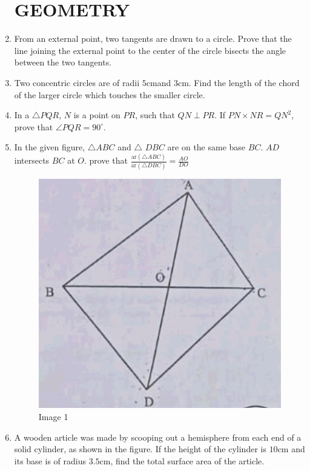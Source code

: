 \documentclass[12pt,-letter paper]{article}
\providecommand{\brak}[1]{\ensuremath{\left(#1\right)}}
\begin{document}
\begin{enumerate}
\section*{GEOMETRY}
\item
From an external point, two tangents are drawn to a circle. Prove that the line joining the external point to the center of the circle bisects the angle between the two tangents.
\item
	Two concentric circles are of radii $5\mathrm{cm}$and $3\mathrm{cm}$. Find the length of the chord of the larger circle which touches the smaller circle.
\item
In a $\triangle{PQR}$, $N$ is a point on $PR$, such that $QN$$\perp$$PR$. If $PN \times NR=QN^2$, prove that $\angle{PQR}=90^{\circ}$.
\newpage
\item
In the given figure, $\triangle ABC$  and  $\triangle$ $DBC$  are on the same base $BC$.  $AD$ intersects $BC$ at $O$.
prove that  $\frac{\text{ar}\brak{\triangle ABC}}{\text{ar}\brak{\triangle DBC}} = \frac{AO}{DO}$
\begin{figure}[h!]
\centering
\includegraphics[width=\columnwidth]{img1.jpg}
\caption{Image 1}
\end{figure} 
\newpage
\item
	A wooden article was made by scooping out a hemisphere from each end of a solid cylinder, as shown in the figure. If the height of the cylinder is $10\mathrm{cm}$ and its base is of radius $3.5\mathrm{cm}$, find the total surface area of the article.

\end{enumerate}
\end{document}

